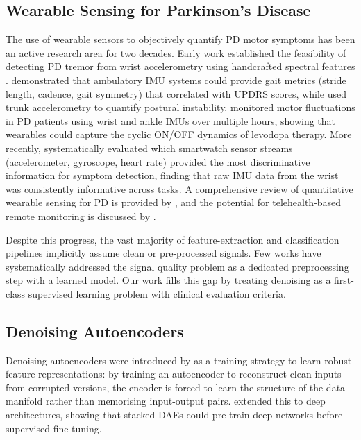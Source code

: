 \documentclass{article}
\begin{document}
\subsection{Wearable Sensing for Parkinson's Disease}

The use of wearable sensors to objectively quantify PD motor symptoms has been
an active research area for two decades.
Early work established the feasibility of detecting PD tremor from wrist
accelerometry using handcrafted spectral features \citep{rigas2012assessment,
tzallas2014unified}.
\citet{salarian2004gait} demonstrated that ambulatory IMU systems could
provide gait metrics (stride length, cadence, gait symmetry) that correlated
with UPDRS scores, while \citet{mancini2011trunk} used trunk accelerometry
to quantify postural instability.
\citet{patel2009monitoring} monitored motor fluctuations in PD patients using
wrist and ankle IMUs over multiple hours, showing that wearables could
capture the cyclic ON/OFF dynamics of levodopa therapy.
More recently, \citet{lonini2018smartwatch} systematically evaluated which
smartwatch sensor streams (accelerometer, gyroscope, heart rate) provided the
most discriminative information for symptom detection, finding that raw IMU
data from the wrist was consistently informative across tasks.
A comprehensive review of quantitative wearable sensing for PD is provided by
\citet{maetzler2013quantitative}, and the potential for telehealth-based remote
monitoring is discussed by \citet{bloem2021telehealth}.

Despite this progress, the vast majority of feature-extraction and
classification pipelines implicitly assume clean or pre-processed signals.
Few works have systematically addressed the signal quality problem as a
dedicated preprocessing step with a learned model.
Our work fills this gap by treating denoising as a first-class supervised
learning problem with clinical evaluation criteria.

\subsection{Denoising Autoencoders}

Denoising autoencoders were introduced by \citet{vincent2008extracting} as a
training strategy to learn robust feature representations: by training an
autoencoder to reconstruct clean inputs from corrupted versions, the encoder
is forced to learn the structure of the data manifold rather than memorising
input-output pairs.
\citet{vincent2010stacked} extended this to deep architectures, showing that
stacked DAEs could pre-train deep networks before supervised fine-tuning.
\end{document}
